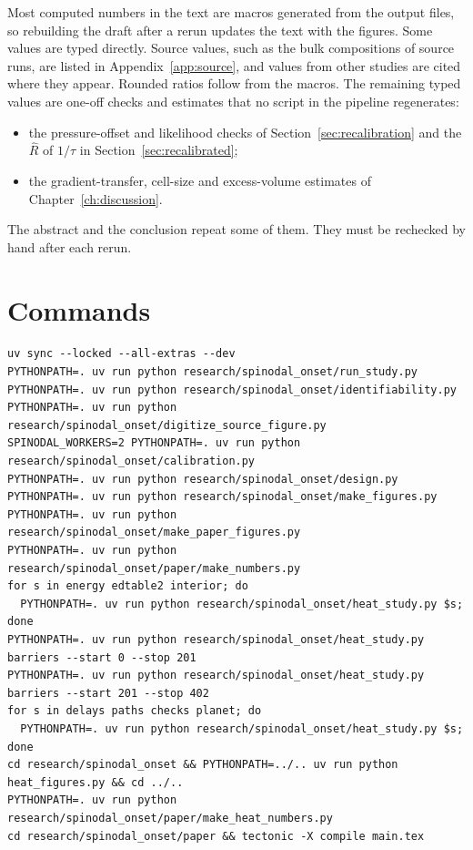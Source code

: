Most computed numbers in the text are macros generated from the output files, so rebuilding
the draft after a rerun updates the text with the figures. Some values are typed directly.
Source values, such as the bulk compositions of source runs, are listed in
Appendix~\ref{app:source}, and values from other studies are cited where they appear. Rounded
ratios follow from the macros. The remaining typed values are one-off checks and estimates that
no script in the pipeline regenerates:
\begin{itemize}
\item the pressure-offset and likelihood checks of Section~\ref{sec:recalibration} and the
$\hat R$ of $1/\tau$ in Section~\ref{sec:recalibrated};
\item the gradient-transfer, cell-size and excess-volume estimates of
Chapter~\ref{ch:discussion}.
\end{itemize}
The abstract and the conclusion repeat some of them. They must be rechecked by hand after each
rerun.

\section{Commands}

\begin{verbatim}
uv sync --locked --all-extras --dev
PYTHONPATH=. uv run python research/spinodal_onset/run_study.py
PYTHONPATH=. uv run python research/spinodal_onset/identifiability.py
PYTHONPATH=. uv run python research/spinodal_onset/digitize_source_figure.py
SPINODAL_WORKERS=2 PYTHONPATH=. uv run python research/spinodal_onset/calibration.py
PYTHONPATH=. uv run python research/spinodal_onset/design.py
PYTHONPATH=. uv run python research/spinodal_onset/make_figures.py
PYTHONPATH=. uv run python research/spinodal_onset/make_paper_figures.py
PYTHONPATH=. uv run python research/spinodal_onset/paper/make_numbers.py
for s in energy edtable2 interior; do
  PYTHONPATH=. uv run python research/spinodal_onset/heat_study.py $s; done
PYTHONPATH=. uv run python research/spinodal_onset/heat_study.py barriers --start 0 --stop 201
PYTHONPATH=. uv run python research/spinodal_onset/heat_study.py barriers --start 201 --stop 402
for s in delays paths checks planet; do
  PYTHONPATH=. uv run python research/spinodal_onset/heat_study.py $s; done
cd research/spinodal_onset && PYTHONPATH=../.. uv run python heat_figures.py && cd ../..
PYTHONPATH=. uv run python research/spinodal_onset/paper/make_heat_numbers.py
cd research/spinodal_onset/paper && tectonic -X compile main.tex
\end{verbatim}


